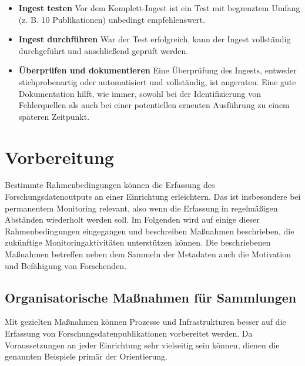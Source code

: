 \documentclass[
  ngerman,
  letterpaper,
  DIV=11]{scrreprt}
\begin{document}
\begin{itemize}
  Metadatenschema des Zielsystems und b) ggf. der für den Ingest
  erforderlichen strukturierten Form zu entsprechen. Für diesen Schritt
  ist eine gute Dokumentation von besonderer Bedeutung, um eine
  wiederholte oder regelmäßige Durchführung vorzubereiten. Die Dokumente
  für die Transformation können ggf. auch veröffentlicht werden, um die
  Nachnutzung durch Dritte zu ermöglichen.
\item
  \textbf{Ingest testen} Vor dem Komplett-Ingest ist ein Test mit
  begrenztem Umfang (z. B. 10 Publikationen) unbedingt empfehlenswert.
\item
  \textbf{Ingest durchführen} War der Test erfolgreich, kann der Ingest
  vollständig durchgeführt und anschließend geprüft werden.
\item
  \textbf{Überprüfen und dokumentieren} Eine Überprüfung des Ingests,
  entweder stichprobenartig oder automatisiert und vollständig, ist
  angeraten. Eine gute Dokumentation hilft, wie immer, sowohl bei der
  Identifizierung von Fehlerquellen als auch bei einer potentiellen
  erneuten Ausführung zu einem späteren Zeitpunkt.
\end{itemize}

\chapter{Vorbereitung}\label{vorbereitung}

Bestimmte Rahmenbedingungen können die Erfassung des
Forschungsdatenoutputs an einer Einrichtung erleichtern. Das ist
insbesondere bei permanentem Monitoring relevant, also wenn die
Erfassung in regelmäßigen Abständen wiederholt werden soll. Im Folgenden
wird auf einige dieser Rahmenbedingungen eingegangen und beschreiben
Maßnahmen beschrieben, die zukünftige Monitoringaktivitäten unterstützen
können. Die beschriebenen Maßnahmen betreffen neben dem Sammeln der
Metadaten auch die Motivation und Befähigung von Forschenden.

\section{Organisatorische Maßnahmen für
Sammlungen}\label{organisatorische-mauxdfnahmen-fuxfcr-sammlungen}

Mit gezielten Maßnahmen können Prozesse und Infrastrukturen besser auf
die Erfassung von Forschungsdatenpublikationen vorbereitet werden. Da
Voraussetzungen an jeder Einrichtung sehr vielseitig sein können, dienen
die genannten Beispiele primär der Orientierung.
\end{document}
